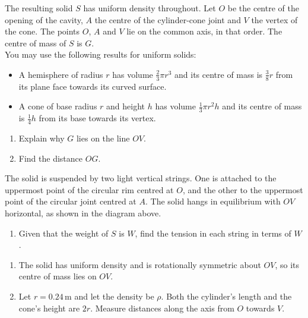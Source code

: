 \documentclass[leqno]{article}
\begin{document}
\begin{enumerate}[
  label=\textbf{\arabic*.},
  leftmargin=*,
  topsep=0pt,
  partopsep=0pt,
  parsep=0pt
]
The resulting solid $S$ has uniform density throughout. Let $O$ be the centre of the opening of the cavity, $A$ the centre of the cylinder-cone joint and $V$ the vertex of the cone. The points $O$, $A$ and $V$ lie on the common axis, in that order. The centre of mass of $S$ is $G$. \\
You may use the following results for uniform solids:
\begin{itemize}[nosep]
\item A hemisphere of radius $r$ has volume $\frac{2}{3}\pi r^3$ and its centre of mass is $\frac38 r$ from its plane face towards its curved surface.
\item A cone of base radius $r$ and height $h$ has volume $\frac{1}{3}\pi r^2h$ and its centre of mass is $\frac14 h$ from its base towards its vertex.
\end{itemize}

\begin{enumerate}[label=\textbf{(\alph*)}]
\item Explain why $G$ lies on the line $OV$.  \\
\item Find the distance $OG$.  \\
\end{enumerate}
The solid is suspended by two light vertical strings. One is attached to the uppermost point of the circular rim centred at $O$, and the other to the uppermost point of the circular joint centred at $A$. The solid hangs in equilibrium with $OV$ horizontal, as shown in the diagram above. \\
\begin{enumerate}[label=\textbf{(\alph*)}, resume]
\item Given that the weight of $S$ is $W$, find the tension in each string in terms of $W$.  \\
\end{enumerate}

\vspace*{10pt}

\begin{djsSolution}
\begin{enumerate}[label=\textbf{(\alph*)}, start=1]
\item The solid has uniform density and is rotationally symmetric about \(OV\), so its centre of mass lies on \(OV\).

\item Let \(r=0.24\,\mathrm{m}\) and let the density be \(\rho\). Both the cylinder's length and the cone's height are \(2r\). Measure distances along the axis from \(O\) towards \(V\).


\end{enumerate}
\end{djsSolution}
\end{enumerate}
\end{document}
